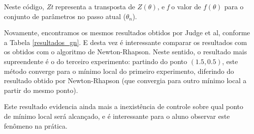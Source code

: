 \documentclass{abnt}
\begin{document}
Neste código, \textit{Zt} representa a transposta de $Z(\theta)$, e \textit{f} o valor de $f(\theta)$ para o conjunto de parâmetros no passo atual ($\theta_n$).

Novamente, encontramos os mesmos resultados obtidos por Judge et al, conforme a Tabela \ref{resultados_gn}. E desta vez é interessante comparar os resultados com os obtidos com o algoritmo de Newton-Rhapson. Neste sentido, o resultado mais supreendente é o do terceiro experimento: partindo do ponto $(1.5, 0.5)$, este método converge para o mínimo local do primeiro experimento, diferindo do resultado obtido por Newton-Rhapson (que convergia para outro mínimo local a partir do mesmo ponto).

Este resultado evidencia ainda mais a inexistência de controle sobre qual ponto de mínimo local será alcançado, e é interessante para o aluno observar este fenômeno na prática.
\end{document}
